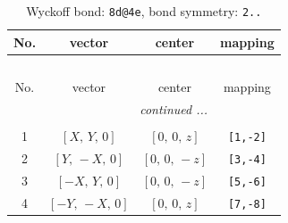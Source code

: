 \documentclass[fleqn,8pt]{jsarticle}
\begin{document}
\renewcommand{\arraystretch}{1.2}
\begin{longtable}{cccc}
\caption{Wyckoff bond: {\tt 8d@4e}, bond symmetry: {\tt 2..}}
 \\
 \hline \hline
No. & vector & center & mapping \\ \hline \endfirsthead

\multicolumn{3}{l}{\tablename\ \thetable{}} \\
 \hline \hline
No. & vector & center & mapping \\ \hline \endhead

 \hline \hline
\multicolumn{3}{r}{\footnotesize\it continued ...} \\ \endfoot

 \hline \hline
\multicolumn{3}{r}{} \\ \endlastfoot

1 & $\left[ X,\, Y,\, 0 \right]$ & $\left[ 0,\, 0,\, z \right]$ & {\tt [1,-2]} \\ \hline
2 & $\left[ Y,\, - X,\, 0 \right]$ & $\left[ 0,\, 0,\, - z \right]$ & {\tt [3,-4]} \\ \hline
3 & $\left[ - X,\, Y,\, 0 \right]$ & $\left[ 0,\, 0,\, - z \right]$ & {\tt [5,-6]} \\ \hline
4 & $\left[ - Y,\, - X,\, 0 \right]$ & $\left[ 0,\, 0,\, z \right]$ & {\tt [7,-8]} \\
\end{longtable}
\renewcommand{\arraystretch}{1.2}
\end{document}
